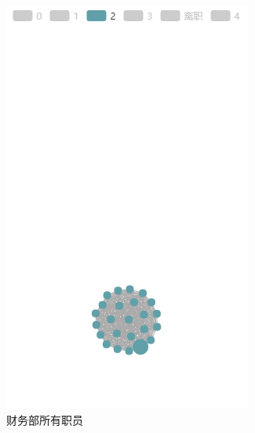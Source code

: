\documentclass[journal]{vgtc}                %
\begin{document}
\begin{figure}
\begin{subfigure}{0.3\linewidth}
		\includegraphics[width=\linewidth]{pictures/5-3.png}
		\caption{财务部所有职员} %
		\label{fig:finance}
	\end{subfigure}
	\begin{subfigure}{0.3\linewidth} %

\end{subfigure}
\end{figure}
\end{document}
